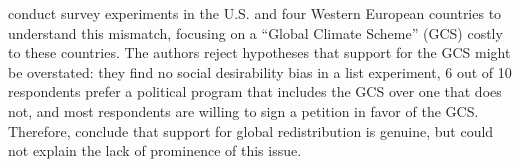 \documentclass[12pt,english]{article}
\begin{document}
\begin{bibunit}

\cite{fabre_majority_2025} conduct survey experiments in the U.S. and four Western European countries to understand this mismatch, focusing on a ``Global Climate Scheme'' (GCS) costly to these countries. The authors reject hypotheses that support for the GCS might be overstated: they find no social desirability bias in a list experiment, 6 out of 10 respondents prefer a political program that includes the GCS over one that does not, and most respondents are willing to sign a petition in favor of the GCS. %
Therefore, \cite{fabre_majority_2025} conclude that support for global redistribution is genuine, %
but could not 
explain the lack of prominence of this issue. 

\end{bibunit}
\end{document}

